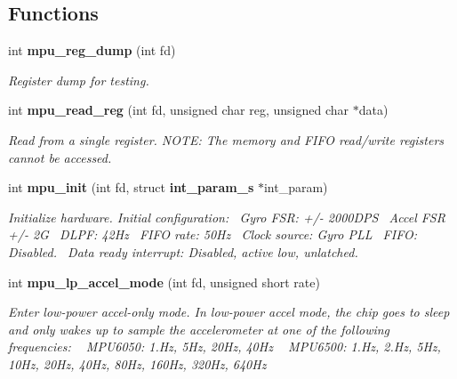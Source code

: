 \subsection*{Functions}
\begin{DoxyCompactItemize}
\item 
int \textbf{ mpu\+\_\+reg\+\_\+dump} (int fd)
\begin{DoxyCompactList}\small\item\em Register dump for testing. \end{DoxyCompactList}\item 
int \textbf{ mpu\+\_\+read\+\_\+reg} (int fd, unsigned char reg, unsigned char $\ast$data)
\begin{DoxyCompactList}\small\item\em Read from a single register. N\+O\+TE\+: The memory and F\+I\+FO read/write registers cannot be accessed. \end{DoxyCompactList}\item 
int \textbf{ mpu\+\_\+init} (int fd, struct \textbf{ int\+\_\+param\+\_\+s} $\ast$int\+\_\+param)
\begin{DoxyCompactList}\small\item\em Initialize hardware. Initial configuration\+:~\newline
Gyro F\+SR\+: +/-\/ 2000\+D\+PS~\newline
Accel F\+SR +/-\/ 2G~\newline
D\+L\+PF\+: 42\+Hz~\newline
F\+I\+FO rate\+: 50\+Hz~\newline
Clock source\+: Gyro P\+LL~\newline
F\+I\+FO\+: Disabled.~\newline
Data ready interrupt\+: Disabled, active low, unlatched. \end{DoxyCompactList}\item 
int \textbf{ mpu\+\_\+lp\+\_\+accel\+\_\+mode} (int fd, unsigned short rate)
\begin{DoxyCompactList}\small\item\em Enter low-\/power accel-\/only mode. In low-\/power accel mode, the chip goes to sleep and only wakes up to sample the accelerometer at one of the following frequencies\+: ~\newline
 M\+P\+U6050\+: 1.\+Hz, 5\+Hz, 20\+Hz, 40\+Hz ~\newline
 M\+P\+U6500\+: 1.\+Hz, 2.\+Hz, 5\+Hz, 10\+Hz, 20\+Hz, 40\+Hz, 80\+Hz, 160\+Hz, 320\+Hz, 640\+Hz ~\newline

\end{DoxyCompactList}
\end{DoxyCompactItemize}
